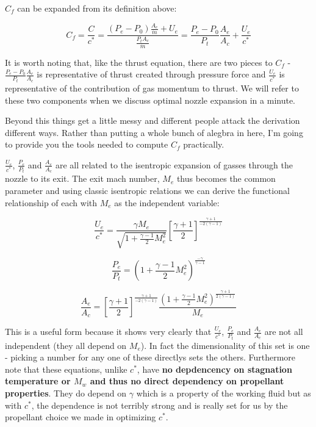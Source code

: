 \documentclass[11pt]{article}
\begin{document}
\(C_f\) can be expanded from its definition above:

\[C_f = \frac{C}{c^*} = \frac{(P_e - P_0)\frac{A_e}{\dot{m}} + U_e}{\frac{P_t A_c}{\dot{m}}} = \frac{P_e - P_0}{P_t}\frac{A_e}{A_c} + \frac{U_e}{c^*}\]

It is worth noting that, like the thrust equation, there are two pieces
to \(C_f\) - \(\frac{P_e - P_0}{P_t}\frac{A_e}{A_c}\) is representative
of thrust created through pressure force and \(\frac{U_e}{c^*}\) is
representative of the contribution of gas momentum to thrust. We will
refer to these two components when we discuss optimal nozzle expansion
in a minute.

Beyond this things get a little messy and different people attack the
derivation different ways. Rather than putting a whole bunch of alegbra
in here, I'm going to provide you the tools needed to compute \(C_f\)
practically.

\(\frac{U_e}{c^*}\), \(\frac{P_e}{P_t}\) and \(\frac{A_e}{A_c}\) are all
related to the isentropic expansion of gasses through the nozzle to its
exit. The exit mach number, \(M_e\) thus becomes the common parameter
and using classic isentropic relations we can derive the functional
relationship of each with \(M_e\) as the independent variable:

\[\frac{U_e}{c^*} = \frac{\gamma M_e}{\sqrt{1 + \frac{\gamma - 1}{2}M_e^2}}\left[\frac{\gamma + 1}{2}\right]^{\frac{\gamma + 1}{-2(\gamma-1)}}\]

\[\frac{P_e}{P_t} = \left(1 + \frac{\gamma - 1}{2}M_e^2\right)^{\frac{-\gamma}{\gamma-1}}\]

\[\frac{A_e}{A_c} = \left[\frac{\gamma + 1}{2}\right]^{\frac{\gamma + 1}{-2(\gamma - 1)}} \frac{\left(1 + \frac{\gamma-1}{2}M_e^2 \right)^{\frac{\gamma + 1}{2(\gamma - 1)}}}{M_e}\]

This is a useful form because it shows very clearly that
\(\frac{U_e}{c^*}\), \(\frac{P_e}{P_t}\) and \(\frac{A_e}{A_c}\) are not
all independent (they all depend on \(M_e\)). In fact the dimensionality
of this set is one - picking a number for any one of these directlys
sets the others. Furthermore note that these equations, unlike \(c^*\),
have \textbf{no depdencency on stagnation temperature or \(M_w\) and
thus no direct dependency on propellant properties}. They do depend on
\(\gamma\) which is a property of the working fluid but as with \(c^*\),
the dependence is not terribly strong and is really set for us by the
propellant choice we made in optimizing \(c^*\).
\end{document}

